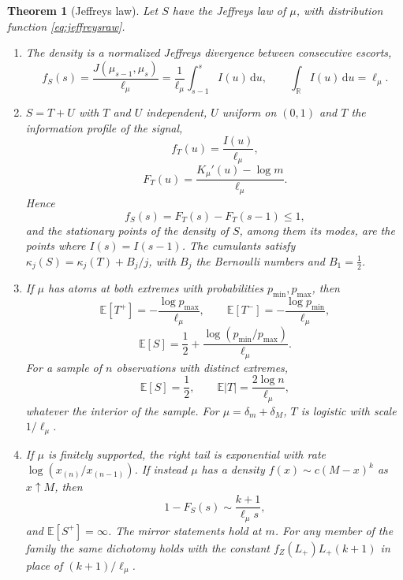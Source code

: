 \documentclass[10pt,a4paper]{amsart}
\newtheorem{theorem}{Theorem}
\providecommand{\E}{\mathbb{E}}
\providecommand{\R}{\mathbb{R}}
\providecommand{\dd}{\,\mathrm{d}}
\begin{document}
	\begin{theorem}[Jeffreys law]
		\label{thm:jeffreys}
		Let $S$ have the Jeffreys law of $\mu$, with distribution
		function \eqref{eq:jeffreysraw}.
		\begin{enumerate}[label=\textup{(\roman*)},leftmargin=2.2em]
			\item The density is a normalized Jeffreys divergence between
			consecutive escorts,
			\begin{equation}\label{eq:jeffreysdensity}
				f_S(s)=\frac{J(\mu_{s-1},\mu_s)}{\ell_\mu}
				=\frac1{\ell_\mu}\int_{s-1}^{s}I(u)\dd u,
				\qquad
				\int_\R I(u)\dd u=\ell_\mu .
			\end{equation}
			\item $S=T+U$ with $T$ and $U$ independent, $U$ uniform on $(0,1)$
			and $T$ the \emph{information profile} of the signal,
			\begin{equation}\label{eq:Tlaw}
				f_T(u)=\frac{I(u)}{\ell_\mu},
			\end{equation}
			\begin{equation}\label{eq:Tlaw2}
				F_T(u)=\frac{K_\mu'(u)-\log m}{\ell_\mu} .
			\end{equation}
			Hence
			\begin{equation}\label{eq:unitincrement}
				f_S(s)=F_T(s)-F_T(s-1)\le1,
			\end{equation}
			and the stationary points of the density of $S$, among them its
			modes, are the points where $I(s)=I(s-1)$. The
			cumulants satisfy $\kappa_j(S)=\kappa_j(T)+B_j/j$, with $B_j$ the
			Bernoulli numbers and $B_1=\tfrac12$.
			\item If $\mu$ has atoms at both extremes with probabilities
			$p_{\min},p_{\max}$, then
			\begin{equation}\label{eq:surprisal}
				\E[T^{+}]=-\frac{\log p_{\max}}{\ell_\mu},
				\qquad
				\E[T^{-}]=-\frac{\log p_{\min}}{\ell_\mu},
			\end{equation}
			\begin{equation}\label{eq:surprisal2}
				\E[S]=\frac12+\frac{\log(p_{\min}/p_{\max})}{\ell_\mu} .
			\end{equation}
			For a sample of $n$ observations with distinct extremes,
			\begin{equation}\label{eq:samplemean}
				\E[S]=\frac12,
				\qquad
				\E|T|=\frac{2\log n}{\ell_\mu},
			\end{equation}
			whatever the interior of the sample. For $\mu=\delta_m+\delta_M$, $T$
			is logistic with scale $1/\ell_\mu$.
			
			\item If $\mu$ is finitely supported, the right tail is exponential
			with rate $\log(x_{(n)}/x_{(n-1)})$. If
			instead $\mu$ has a density $f(x)\sim c(M-x)^{k}$ as $x\uparrow M$,
			then
			\begin{equation}\label{eq:cauchytail}
				1-F_S(s)\sim\frac{k+1}{\ell_\mu s},
			\end{equation}
			and $\E[S^{+}]=\infty$. The mirror statements hold at $m$. For
			any member of the family the same dichotomy holds with the
			constant $f_Z(L_+)L_+(k+1)$ in place of $(k+1)/\ell_\mu$.
		\end{enumerate}
	\end{theorem}
\end{document}
